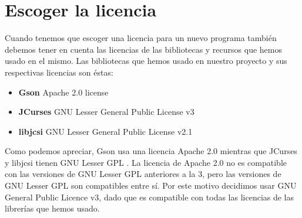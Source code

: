 \chapter{Escoger la licencia}

Cuando tenemos que escoger una licencia para un nuevo programa también debemos tener en cuenta las licencias de las bibliotecas y recursos que hemos usado en el mismo. Las bibliotecas que hemos usado en nuestro proyecto y sus respectivas licencias son éstas:

\begin{itemize}
  \item \textbf{Gson} Apache 2.0 license
  \item \textbf{JCurses} GNU Lesser General Public License v3
  \item \textbf{libjcsi} GNU Lesser General Public License v2.1
\end{itemize}

\noindent Como podemos apreciar, Gson usa una licencia Apache 2.0\cite{website:apachelicense} mientras que JCurses y libjcsi tienen GNU Lesser GPL \cite{website:gnulicense}.
La licencia de Apache 2.0 no es compatible con las versiones de GNU Lesser GPL anteriores a la 3, pero las versiones de GNU Lesser GPL son compatibles entre sí.
Por este motivo decidimos usar GNU General Public Licence v3, dado que es compatible con todas las licencias de las librerías que hemos usado.
